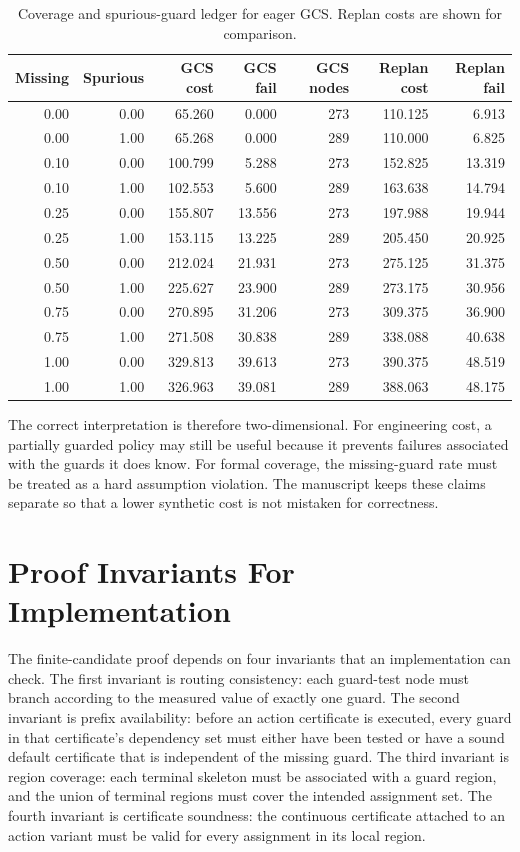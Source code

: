 \documentclass{article}
\begin{document}
\begin{table}[p]
\centering
\caption{Coverage and spurious-guard ledger for eager GCS. Replan costs are shown for comparison.}
\label{tab:coverage-spurious-ledger}
\scriptsize
\begin{tabular}{rrrrrrr}
\toprule
Missing & Spurious & GCS cost & GCS fail & GCS nodes & Replan cost & Replan fail\\
\midrule
0.00 & 0.00 & 65.260 & 0.000 & 273 & 110.125 & 6.913\\
0.00 & 1.00 & 65.268 & 0.000 & 289 & 110.000 & 6.825\\
0.10 & 0.00 & 100.799 & 5.288 & 273 & 152.825 & 13.319\\
0.10 & 1.00 & 102.553 & 5.600 & 289 & 163.638 & 14.794\\
0.25 & 0.00 & 155.807 & 13.556 & 273 & 197.988 & 19.944\\
0.25 & 1.00 & 153.115 & 13.225 & 289 & 205.450 & 20.925\\
0.50 & 0.00 & 212.024 & 21.931 & 273 & 275.125 & 31.375\\
0.50 & 1.00 & 225.627 & 23.900 & 289 & 273.175 & 30.956\\
0.75 & 0.00 & 270.895 & 31.206 & 273 & 309.375 & 36.900\\
0.75 & 1.00 & 271.508 & 30.838 & 289 & 338.088 & 40.638\\
1.00 & 0.00 & 329.813 & 39.613 & 273 & 390.375 & 48.519\\
1.00 & 1.00 & 326.963 & 39.081 & 289 & 388.063 & 48.175\\
\bottomrule
\end{tabular}
\end{table}

The correct interpretation is therefore two-dimensional. For engineering cost, a partially guarded policy may still be useful because it prevents failures associated with the guards it does know. For formal coverage, the missing-guard rate must be treated as a hard assumption violation. The manuscript keeps these claims separate so that a lower synthetic cost is not mistaken for correctness.

\section{Proof Invariants For Implementation}
The finite-candidate proof depends on four invariants that an implementation can check. The first invariant is routing consistency: each guard-test node must branch according to the measured value of exactly one guard. The second invariant is prefix availability: before an action certificate is executed, every guard in that certificate's dependency set must either have been tested or have a sound default certificate that is independent of the missing guard. The third invariant is region coverage: each terminal skeleton must be associated with a guard region, and the union of terminal regions must cover the intended assignment set. The fourth invariant is certificate soundness: the continuous certificate attached to an action variant must be valid for every assignment in its local region.
\end{document}
